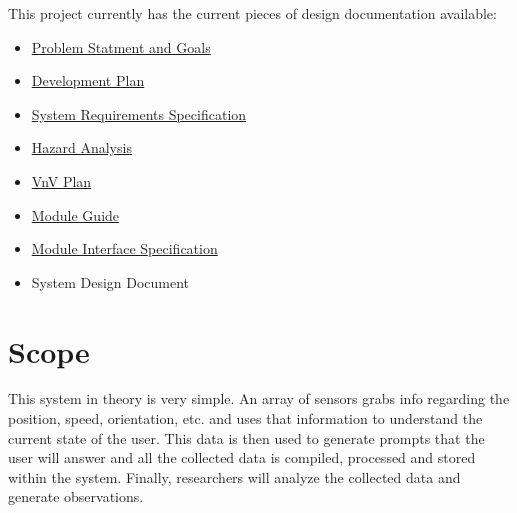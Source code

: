 \documentclass[12pt, titlepage]{article}
\begin{document}
This project currently has the current pieces of design documentation available:

\begin{itemize}
	\item \href{https://github.com/zakerl/Capstone_Project/blob/desDoc_Labeeb/docs/ProblemStatementAndGoals/Team1_ProblemStatement\%20\%26\%20Goals.pdf}{Problem Statment and Goals}\\
	\item \href{https://github.com/zakerl/Capstone_Project/blob/desDoc_Labeeb/docs/DevelopmentPlan/DevelopmentPlan.pdf}{Development Plan}\\
	\item \href{https://github.com/zakerl/Capstone_Project/blob/desDoc_Labeeb/docs/SRS/SRS.pdf}{System Requirements Specification}\\
	\item \href{https://github.com/zakerl/Capstone_Project/blob/desDoc_Labeeb/docs/HazardAnalysis/HazardAnalysis.pdf}{Hazard Analysis}\\
	\item \href{https://github.com/zakerl/Capstone_Project/blob/desDoc_Labeeb/docs/VnVPlan/VnVPlan.pdf}{VnV Plan}\\
	\item \href{https://github.com/zakerl/Capstone_Project/blob/desDoc_Labeeb/docs/Design/SoftArchitecture/MG.pdf}{Module Guide}\\
	\item \href{https://github.com/zakerl/Capstone_Project/blob/desDoc_Labeeb/docs/Design/SoftDetailedDes/MIS.pdf}{Module Interface Specification}\\
	\item System Design Document\\
\end{itemize}

\section{Scope}

This system in theory is very simple. An array of sensors grabs info regarding the position, speed, orientation, etc. and uses that information to understand the current state of the user. This data is then used to generate prompts that the user will answer and all the collected data is compiled, processed and stored within the system. Finally, researchers will analyze the collected data and generate observations. \\
\end{document}

